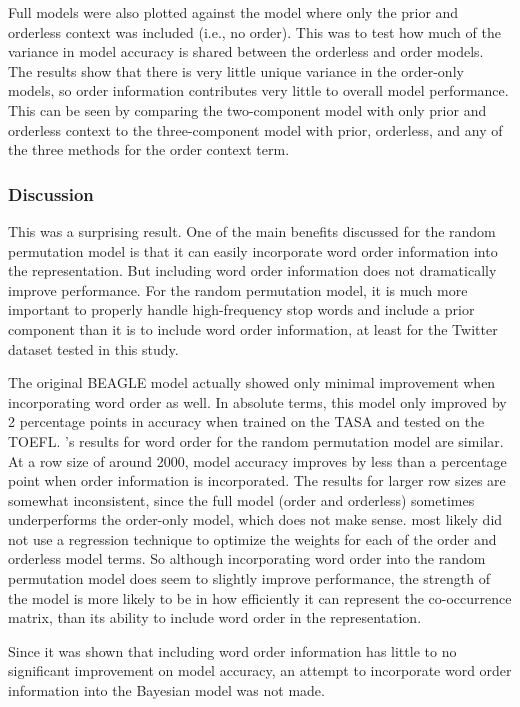 \documentclass[man,floatsintext,donotrepeattitle]{apa6}
\begin{document}
Full models were also plotted against the model where only the prior and orderless context was included (i.e., no order).
This was to test how much of the variance in model accuracy is shared between the orderless and order models.
The results show that there is very little unique variance in the order-only models, so order information contributes very little to overall model performance.
This can be seen by comparing the two-component model with only prior and orderless context to the three-component model with prior, orderless, and any of the three methods for the order context term.

\subsubsection{Discussion}

This was a surprising result.
One of the main benefits discussed for the random permutation model is that it can easily incorporate word order information into the representation.
But including word order information does not dramatically improve performance. 
For the random permutation model, it is much more important to properly handle high-frequency stop words and include a prior component than it is to include word order information,
at least for the Twitter dataset tested in this study.

The original BEAGLE model \parencite{Jones2007} actually showed only minimal improvement when incorporating word order as well.
In absolute terms, this model only improved by 2 percentage points in accuracy when trained on the TASA and tested on the TOEFL.
\textcite{Sahlgren2008}'s results for word order for the random permutation model are similar.
At a row size of around \num{2000}, model accuracy improves by less than a percentage point when order information is incorporated.
The results for larger row sizes are somewhat inconsistent, since the full model (order and orderless) sometimes underperforms the order-only model, which does not make sense.
\textcite{Sahlgren2008} most likely did not use a regression technique to optimize the weights for each of the order and orderless model terms.
So although incorporating word order into the random permutation model does seem to slightly improve performance,
the strength of the model is more likely to be in how efficiently it can represent the co-occurrence matrix, than its ability to include word order in the representation.

Since it was shown that including word order information has little to no significant improvement on model accuracy, an attempt to incorporate word order information into the Bayesian model was not made.
\end{document}
